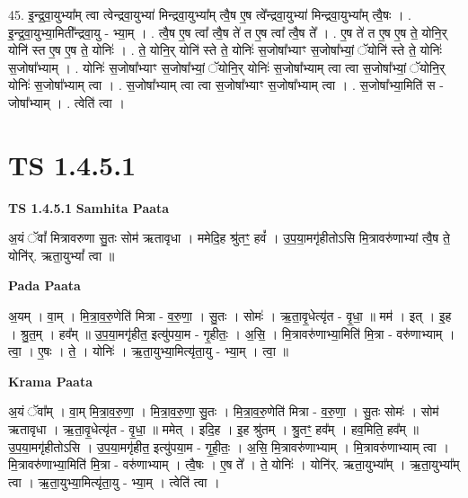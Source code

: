 \documentclass[17pt]{extarticle}
\begin{document}
45. इ॒न्द्र॒वा॒युभ्या᳚म् त्वा त्वेन्द्रवा॒युभ्या॑ मिन्द्रवा॒युभ्या᳚म् त्वै॒ष ए॒ष त्वे᳚न्द्रवा॒युभ्या॑ मिन्द्रवा॒युभ्या᳚म् त्वै॒षः । . इ॒न्द्र॒वा॒युभ्या॒मिती᳚न्द्रवा॒यु - भ्या॒म् । . त्वै॒ष ए॒ष त्वा᳚ त्वै॒ष ते॑ त ए॒ष त्वा᳚ त्वै॒ष ते᳚ । . ए॒ष ते॑ त ए॒ष ए॒ष ते॒ योनि॒र् योनि॑ स्त ए॒ष ए॒ष ते॒ योनिः॑ । . ते॒ योनि॒र् योनि॑ स्ते ते॒ योनिः॑ स॒जोषा᳚भ्याꣳ स॒जोषा᳚भ्यां॒ ॅयोनि॑ स्ते ते॒ योनिः॑ स॒जोषा᳚भ्याम् । . योनिः॑ स॒जोषा᳚भ्याꣳ स॒जोषा᳚भ्यां॒ ॅयोनि॒र् योनिः॑ स॒जोषा᳚भ्याम् त्वा त्वा स॒जोषा᳚भ्यां॒ ॅयोनि॒र् योनिः॑ 
स॒जोषा᳚भ्याम् त्वा । . स॒जोषा᳚भ्याम् त्वा त्वा स॒जोषा᳚भ्याꣳ स॒जोषा᳚भ्याम् त्वा । . स॒जोषा᳚भ्या॒मिति॑ स - जोषा᳚भ्याम् । . त्वेति॑ त्वा । \newline
\pagebreak
{}
\section*{ TS 1.4.5.1 }

\textbf{TS 1.4.5.1 } \newline
\textbf{Samhita Paata} \newline

अ॒यं ॅवां᳚ मित्रावरुणा सु॒तः सोम॑ ऋतावृधा । ममेदि॒ह श्रु॑तꣳ॒॒ हवं᳚ । उ॒प॒या॒मगृ॑हीतोऽसि मि॒त्रावरु॑णाभ्यां त्वै॒ष ते॒ योनि॑र्. ऋता॒युभ्यां᳚ त्वा ॥ \newline

\textbf{Pada Paata} \newline

अ॒यम् । वा॒म् । मि॒त्रा॒व॒रु॒णेति॑ मित्रा - व॒रु॒णा॒ । सु॒तः । सोमः॑ । ऋ॒ता॒वृ॒धेत्यृ॑त - वृ॒धा॒ ॥ मम॑ । इत् । इ॒ह । श्रु॒त॒म् । हव᳚म् ॥ उ॒प॒या॒मगृ॑हीत॒ इत्यु॑पया॒म - गृ॒हीतः॒ । अ॒सि॒ । मि॒त्रावरु॑णाभ्या॒मिति॑ मि॒त्रा - वरु॑णाभ्याम् । त्वा॒ । ए॒षः । ते॒ । योनिः॑ । ऋ॒ता॒युभ्या॒मित्यृ॑ता॒यु - भ्या॒म् । त्वा॒ ॥  \newline


\textbf{Krama Paata} \newline

अ॒यं ॅवा᳚म् । वा॒म् मि॒त्रा॒व॒रु॒णा॒ । मि॒त्रा॒व॒रु॒णा॒ सु॒तः । मि॒त्रा॒व॒रु॒णेति॑ मित्रा - व॒रु॒णा॒ । सु॒तः सोमः॑ । सोम॑ ऋतावृधा । ऋ॒ता॒वृ॒धेत्यृ॑त - वृ॒धा॒ ॥ ममेत् । इदि॒ह । इ॒ह श्रु॑तम् । श्रु॒तꣳ॒॒ हव᳚म् । हव॒मिति॒ हव᳚म् ॥ उ॒प॒या॒मगृ॑हीतोऽसि । उ॒प॒या॒मगृ॑हीत॒ इत्यु॑पया॒म - गृ॒ही॒तः॒ । अ॒सि॒ मि॒त्रावरु॑णाभ्याम् । मि॒त्रावरु॑णाभ्याम् त्वा । मि॒त्रावरु॑णाभ्या॒मिति॑ मि॒त्रा - वरु॑णाभ्याम् । त्वै॒षः । ए॒ष ते᳚ । ते॒ योनिः॑ । योनि॑र्. ऋता॒युभ्या᳚म् । ऋ॒ता॒युभ्या᳚म् त्वा । ऋ॒ता॒युभ्या॒मित्यृ॑ता॒यु - भ्या॒म् । त्वेति॑ त्वा । \newline
\end{document}
